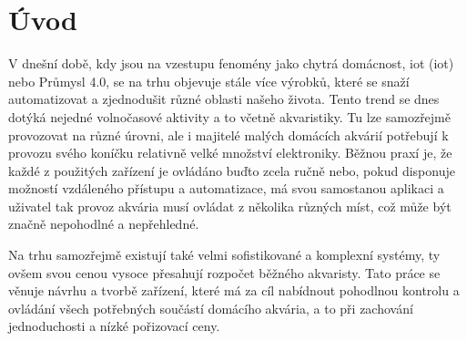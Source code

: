 \chapter*{Úvod}
{}


V dnešní době, kdy jsou na vzestupu fenomény jako chytrá domácnost, \acs{iot} (\acl{iot}) nebo Průmysl 4.0, se na trhu objevuje stále více výrobků, které se snaží automatizovat a zjednodušit různé oblasti našeho života. Tento trend se dnes dotýká nejedné volnočasové aktivity a to včetně akvaristiky. Tu lze samozřejmě provozovat na různé úrovni, ale i majitelé malých domácích akvárií potřebují k provozu svého koníčku relativně velké množství elektroniky. 
Běžnou praxí je, že každé z použitých zařízení je ovládáno buďto zcela ručně nebo, pokud disponuje možností vzdáleného přístupu a automatizace, má svou samostanou aplikaci a uživatel tak provoz akvária musí ovládat z několika různých míst, což může být značně nepohodlné a nepřehledné.

Na trhu samozřejmě existují také velmi sofistikované a komplexní systémy, ty ovšem svou cenou vysoce přesahují rozpočet běžného  akvaristy. Tato práce se věnuje návrhu a tvorbě zařízení, které má za cíl nabídnout pohodlnou kontrolu a ovládání všech potřebných součástí domácího akvária, a to při zachování jednoduchosti a nízké pořizovací ceny.
